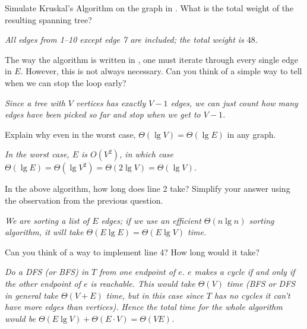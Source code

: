 \documentclass{tufte-handout}
\begin{document}
\begin{questions}
\item Simulate Kruskal's Algorithm on the graph in
  .  What is the total weight of the resulting
  spanning tree?

  \emph{All edges from 1--10 except edge 7 are included; the total
    weight is $48$.}
\item The way the algorithm is written in , one
  must iterate through every single edge in $E$.  However, this is not
  always necessary.  Can you think of a simple way to tell when we can
  stop the loop early?

  \emph{Since a tree with $V$ vertices has exactly $V-1$ edges, we can
  just count how many edges have been picked so far and stop when we
  get to $V-1$.}
\item Explain why even in the worst case,
  $\Theta(\lg V) = \Theta(\lg E)$ in any graph.

  \emph{In the worst case, $E$ is $O(V^2)$, in which case $\Theta(\lg
    E) = \Theta(\lg V^2) = \Theta(2 \lg V) = \Theta(\lg V)$.}
\item In the above algorithm, how long does line 2 take?  Simplify
  your answer using the observation from the previous question.

  \emph{We are sorting a list of $E$ edges; if we use an efficient
    $\Theta(n \lg n)$ sorting algorithm, it will take $\Theta(E \lg E)
    = \Theta(E \lg V)$ time.}
\item Can you think of a way to implement line 4?  How long would it
  take?

  \emph{Do a DFS (or BFS) in $T$ from one endpoint of $e$.  $e$
    makes a cycle if and only if the other endpoint of $e$ is
    reachable.  This would take $\Theta(V)$ time (BFS or DFS in
    general take $\Theta(V+E)$ time, but in this case since $T$ has no
    cycles it can't have more edges than vertices).  Hence the total
    time for the whole algorithm would be $\Theta(E \lg V) + \Theta(E
    \cdot V) = \Theta(VE)$.}
\end{questions}

\pause
\end{document}
